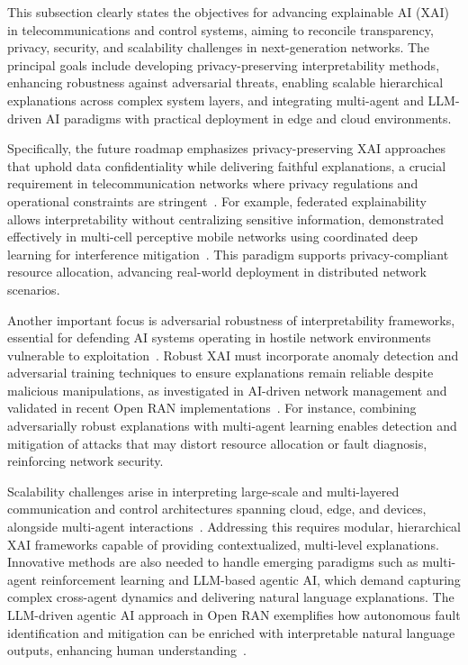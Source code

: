 \documentclass[sigconf]{acmart}
\begin{document}
This subsection clearly states the objectives for advancing explainable AI (XAI) in telecommunications and control systems, aiming to reconcile transparency, privacy, security, and scalability challenges in next-generation networks. The principal goals include developing privacy-preserving interpretability methods, enhancing robustness against adversarial threats, enabling scalable hierarchical explanations across complex system layers, and integrating multi-agent and LLM-driven AI paradigms with practical deployment in edge and cloud environments.

Specifically, the future roadmap emphasizes privacy-preserving XAI approaches that uphold data confidentiality while delivering faithful explanations, a crucial requirement in telecommunication networks where privacy regulations and operational constraints are stringent~\cite{ref48}. For example, federated explainability allows interpretability without centralizing sensitive information, demonstrated effectively in multi-cell perceptive mobile networks using coordinated deep learning for interference mitigation~\cite{ref48}. This paradigm supports privacy-compliant resource allocation, advancing real-world deployment in distributed network scenarios.

Another important focus is adversarial robustness of interpretability frameworks, essential for defending AI systems operating in hostile network environments vulnerable to exploitation~\cite{ref50}. Robust XAI must incorporate anomaly detection and adversarial training techniques to ensure explanations remain reliable despite malicious manipulations, as investigated in AI-driven network management and validated in recent Open RAN implementations~\cite{ref50, ref54}. For instance, combining adversarially robust explanations with multi-agent learning enables detection and mitigation of attacks that may distort resource allocation or fault diagnosis, reinforcing network security.

Scalability challenges arise in interpreting large-scale and multi-layered communication and control architectures spanning cloud, edge, and devices, alongside multi-agent interactions~\cite{ref55}. Addressing this requires modular, hierarchical XAI frameworks capable of providing contextualized, multi-level explanations. Innovative methods are also needed to handle emerging paradigms such as multi-agent reinforcement learning and LLM-based agentic AI, which demand capturing complex cross-agent dynamics and delivering natural language explanations. The LLM-driven agentic AI approach in Open RAN exemplifies how autonomous fault identification and mitigation can be enriched with interpretable natural language outputs, enhancing human understanding~\cite{ref55}.
\end{document}
